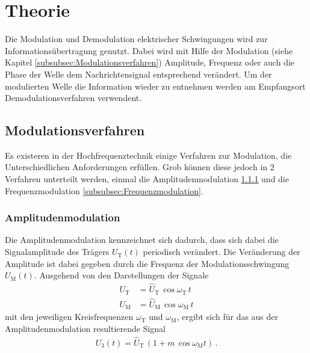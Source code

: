 \section{Theorie}
\label{sec:Theorie}
Die Modulation und Demodulation
elektrischer Schwingungen wird
zur Informationsübertragung genutzt.
Dabei wird mit Hilfe der Modulation
(siehe Kapitel \ref{subsubsec:Modulationsverfahren})
Amplitude, Frequenz oder auch die Phase
der Welle dem Nachrichtensignal entsprechend
verändert.
Um der modulierten Welle die Information
wieder zu entnehmen werden am Empfangsort
Demodulationsverfahren verwendent.

\subsection{Modulationsverfahren}
\label{subsec:Modulationsverfahren}
Es existeren in der Hochfrequenztechnik einige
Verfahren zur Modulation, die Unterschiedlichen
Anforderungen erfüllen. Grob können diese
jedoch in 2 Verfahren unterteilt
werden, einmal die Amplitudenmodulation \ref{subsubsec:Amplitudenmodulation}
und die Frequenzmodulation \ref{subsubsec:Frequenzmodulation}.


\subsubsection{Amplitudenmodulation}
\label{subsubsec:Amplitudenmodulation}
Die Amplitudenmodulation kennzeichnet sich
dadurch, dass sich dabei die Signalamplitude
des Trägers $U_{\text{T}}(t)$ periodisch verändert.
Die Veränderung der Amplitude ist dabei gegeben
durch die Frequenz der Modulationsschwingung
$U_{\text{M}}(t)$.
Ausgehend von den Darstellungen der Signale
\begin{align}
  U_{\text{T}} &= \hat{U}_{\text{T}} \, \cos \omega_{\text{T}} \, t \\
  U_{\text{M}} &= \hat{U}_{\text{M}} \, \cos \omega_{\text{M}} \, t
\end{align}
mit den jeweiligen Kreisfrequenzen $\omega_{\text{T}}$ und $\omega_{\text{M}}$,
ergibt sich für das aus der Amplitudenmodulation resultierende Signal
\begin{align}
  \label{eqn:1}
  U_{3}(t) = \hat{U}_{\text{T}} \, \left( 1 + m \, \cos \omega_{\text{M}} t \right) \, .
\end{align}

